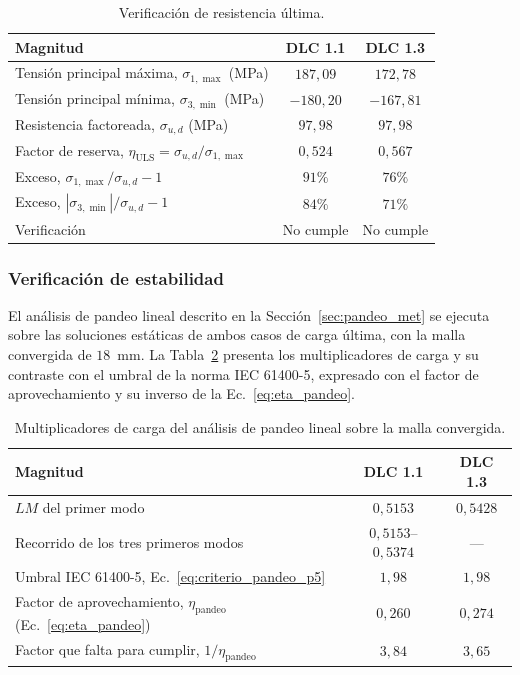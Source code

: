 \begin{table}[H]
    \centering
    \caption{Verificación de resistencia última.}
    \label{tab:verif_uls}
    \begin{tabular}{lcc}
        \hline
        \textbf{Magnitud} & \textbf{DLC 1.1} & \textbf{DLC 1.3} \\
        \hline
        Tensión principal máxima, $\sigma_{1,\max}$ (MPa) & $187{,}09$ & $172{,}78$ \\
        Tensión principal mínima, $\sigma_{3,\min}$ (MPa) & $-180{,}20$ & $-167{,}81$ \\
        Resistencia factoreada, $\sigma_{u,d}$ (MPa) & $97{,}98$ & $97{,}98$ \\
        Factor de reserva, $\eta_{\text{ULS}} = \sigma_{u,d}/\sigma_{1,\max}$ & $0{,}524$ & $0{,}567$ \\
        Exceso, $\sigma_{1,\max}/\sigma_{u,d} - 1$ & $91\%$ & $76\%$ \\
        Exceso, $|\sigma_{3,\min}|/\sigma_{u,d} - 1$ & $84\%$ & $71\%$ \\
        Verificación & No cumple & No cumple \\
        \hline
    \end{tabular}
\end{table}

\subsubsection{Verificación de estabilidad}
\label{sec:verif_estabilidad}

El análisis de pandeo lineal descrito en la Sección~\ref{sec:pandeo_met} se ejecuta sobre las soluciones estáticas de ambos casos de carga última, con la malla convergida de $18$~mm. La Tabla~\ref{tab:pandeo} presenta los multiplicadores de carga y su contraste con el umbral de la norma IEC 61400-5, expresado con el factor de aprovechamiento y su inverso de la Ec.~\ref{eq:eta_pandeo}.

\begin{table}[H]
    \centering
    \caption[Multiplicadores de carga del análisis de pandeo lineal.]{Multiplicadores de carga del análisis de pandeo lineal sobre la malla convergida.}
    \label{tab:pandeo}
    \begin{tabular}{lcc}
        \hline
        \textbf{Magnitud} & \textbf{DLC 1.1} & \textbf{DLC 1.3} \\
        \hline
        $LM$ del primer modo & $0{,}5153$ & $0{,}5428$ \\
        Recorrido de los tres primeros modos & $0{,}5153$--$0{,}5374$ & --- \\
        \hline
        Umbral IEC 61400-5, Ec.~\ref{eq:criterio_pandeo_p5} & $1{,}98$ & $1{,}98$ \\
        Factor de aprovechamiento, $\eta_{\text{pandeo}}$ (Ec.~\ref{eq:eta_pandeo}) & $0{,}260$ & $0{,}274$ \\
        Factor que falta para cumplir, $1/\eta_{\text{pandeo}}$ & $3{,}84$ & $3{,}65$ \\
        \hline
    \end{tabular}
\end{table}

